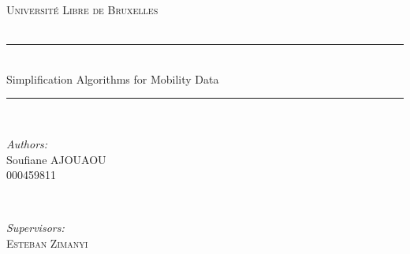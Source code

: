 \documentclass[twoside,12pt, a4paper]{report}
\begin{document}
\begin{titlepage}
\newcommand{\HRule}{\rule{\linewidth}{0.5mm}} %

\center %
 

\textsc{\LARGE Université Libre de Bruxelles}\\[1.5cm] %
\textsc{\Large }\\[0.5cm] %


\HRule \\[0.4cm]
{ \huge Simplification Algorithms for Mobility Data \bfseries }\\[0.4cm] %
\HRule \\[1.2cm]
 

\begin{minipage}{0.4\textwidth}
\begin{flushleft} \large
\emph{Authors:}\\
Soufiane \textsc{AJOUAOU}\\  000459811\\


\end{flushleft}
\end{minipage}
~
\begin{minipage}{0.5\textwidth}
\begin{flushright} 
\emph{Supervisors:} \\
 \textsc{Esteban Zimanyi}\\


\end{flushright}
\end{minipage}\\[2cm]



\end{titlepage}
\end{document}
